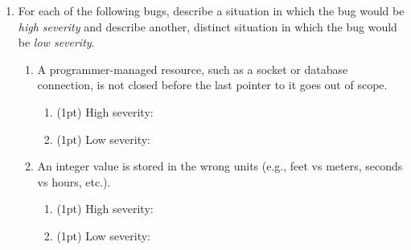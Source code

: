 \documentclass{report}
\newif\ifkey
\newcommand{\answerlong}[1]{\ifkey\color{red}\textbf{#1}\color{black}\else\vspace{0.5in}\fi\xspace}
\newcommand*{\pts}[1]{\addtocounter{points}{#1}(#1pt)}
\begin{document}
\begin{spacing}{1.4}
\begin{enumerate}[leftmargin=*]
  \item For each of the following bugs, describe a situation in which the bug would be \emph{high severity}
    and describe another, distinct situation in which the bug would be \emph{low severity}.
    \begin{enumerate}
    \item A programmer-managed resource, such as a socket or database connection, is not closed before
      the last pointer to it goes out of scope.
      \begin{enumerate}
        \item \pts{1} High severity: \answerlong{A long-running program, such as a webserver, which may eventually run out of resources.}
        \item \pts{1} Low severity: \answerlong{a short-running program, such as one that sends a single ping and then exits: the resource will
          be freed when the program ends, anyway. Other examples are possible.}
      \end{enumerate}
    \item An integer value is stored in the wrong units (e.g., feet vs meters, seconds vs hours, etc.).
      \begin{enumerate}
      \item \pts{1} High severity: \answerlong{Mars polar orbiter crash.}
        \item \pts{1} Low severity: \answerlong{The integer value is part of a game
        and is only displayed to the user: e.g., it doesn't matter if an imaginary car's speed is in m/s or mph.
        Other answers are possible.}
          \end{enumerate}
      \end{enumerate}


\end{enumerate}
\end{spacing}
\end{document}
